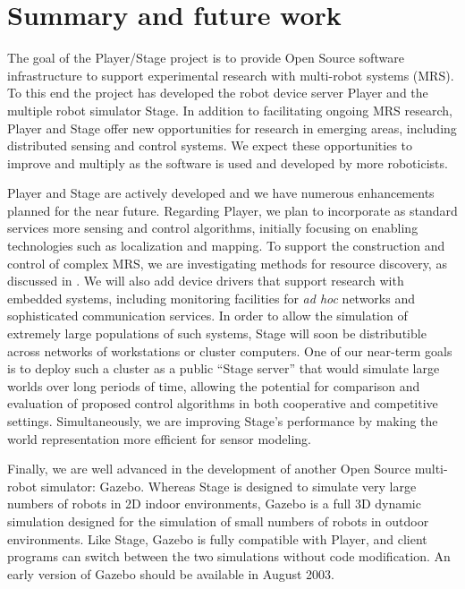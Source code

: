 \documentclass[a4paper]{ICAR2003}
\begin{document}
\section{Summary and future work}
\label{sect:conc}
The goal of the Player/Stage project is to provide Open Source software
infrastructure to support experimental research with multi-robot systems
(MRS).  To this end the project has developed the robot device server
Player and the multiple robot simulator Stage.  In addition to facilitating
ongoing MRS research, Player and Stage offer new opportunities for research
in emerging areas, including distributed sensing and control systems.
We expect these opportunities to improve and multiply as the software is
used and developed by more roboticists.

Player and Stage are actively developed and we have numerous enhancements
planned for the near future.  Regarding Player, we plan to incorporate as
standard services more sensing and control algorithms, initially focusing
on enabling technologies such as localization and mapping.  To support
the construction and control of complex MRS, we are investigating methods
for resource discovery, as discussed in \cite{VaughanGerkeyHoward03}.
We will also add device drivers that support research with embedded
systems, including monitoring facilities for {\em ad hoc} networks and
sophisticated communication services.  In order to allow the simulation
of extremely large populations of such systems, Stage will soon be
distributible across networks of workstations or cluster computers.
One of our near-term goals is to deploy such a cluster as a public ``Stage
server'' that would simulate large worlds over long periods of time,
allowing the potential for comparison and evaluation of proposed control
algorithms in both cooperative and competitive settings.  Simultaneously,
we are improving Stage's performance by making the world representation
more efficient for sensor modeling.

Finally, we are well advanced in the development of another
Open Source multi-robot simulator: Gazebo.  Whereas Stage is designed
to simulate very large numbers of robots in 2D indoor environments,
Gazebo is a full 3D dynamic simulation designed for the simulation of
small numbers of robots in outdoor environments.  Like Stage, Gazebo
is fully compatible with Player, and client programs can switch
between the two simulations without code modification.  An early
version of Gazebo should be available in August 2003.
\end{document}
